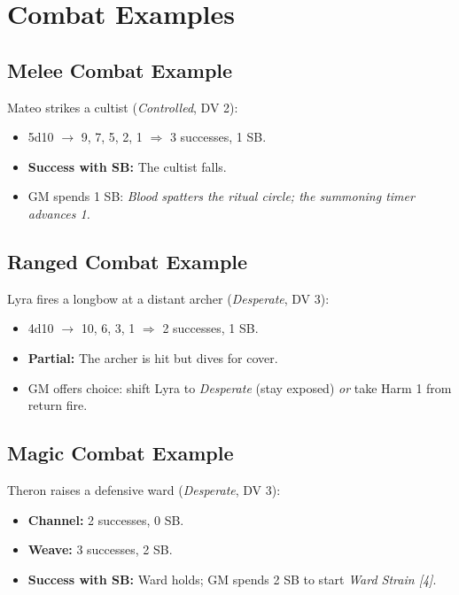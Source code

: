 \section{Combat Examples}\label{sec:combat_examples}

\subsection{Melee Combat Example}\label{subsec:melee_example}
Mateo strikes a cultist (\textit{Controlled}, DV 2):
\begin{itemize}
    \item 5d10 $\rightarrow$ 9, 7, 5, 2, 1 $\Rightarrow$ 3 successes, 1 SB.
    \item \textbf{Success with SB:} The cultist falls.
    \item GM spends 1 SB: \emph{Blood spatters the ritual circle; the summoning timer advances 1.}
\end{itemize}

\subsection{Ranged Combat Example}\label{subsec:ranged_example}
Lyra fires a longbow at a distant archer (\textit{Desperate}, DV 3):
\begin{itemize}
    \item 4d10 $\rightarrow$ 10, 6, 3, 1 $\Rightarrow$ 2 successes, 1 SB.
    \item \textbf{Partial:} The archer is hit but dives for cover.
    \item GM offers choice: shift Lyra to \textit{Desperate} (stay exposed) \emph{or} take Harm 1 from return fire.
\end{itemize}

\subsection{Magic Combat Example}\label{subsec:magic_example}
Theron raises a defensive ward (\textit{Desperate}, DV 3):
\begin{itemize}
    \item \textbf{Channel:} 2 successes, 0 SB.
    \item \textbf{Weave:} 3 successes, 2 SB.
    \item \textbf{Success with SB:} Ward holds; GM spends 2 SB to start \emph{Ward Strain [4]}.
\end{itemize}


